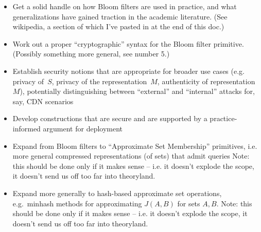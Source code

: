 \begin{itemize}
\item Get a solid handle on how Bloom filters are used in practice, and what generalizations have gained traction in the academic literature. (See wikipedia, a section of which I’ve pasted in at the end of this doc.)
\item Work out a proper “cryptographic” syntax for the Bloom filter primitive.  (Possibly something more general, see number 5.)
\item Establish security notions that are appropriate for broader use cases (e.g. privacy of~$S$, privacy of the representation~$M$, authenticity of representation~$M$), potentially distinguishing between “external” and “internal” attacks for, say, CDN scenarios
\item Develop constructions that are secure and are supported by a practice-informed argument for deployment
\item Expand from Bloom filters to “Approximate Set Membership” primitives, i.e. more general compressed representations (of sets) that admit queries  Note: this should be done only if it makes sense -- i.e. it doesn’t explode the scope, it doesn’t send us off too far into theoryland.
\item Expand more generally to hash-based approximate set operations, e.g.\ minhash methods for approximating $J(A,B)$ for sets $A,B$.  Note: this should be done only if it makes sense -- i.e. it doesn’t explode the scope, it doesn’t send us off too far into theoryland.
\end{itemize}


